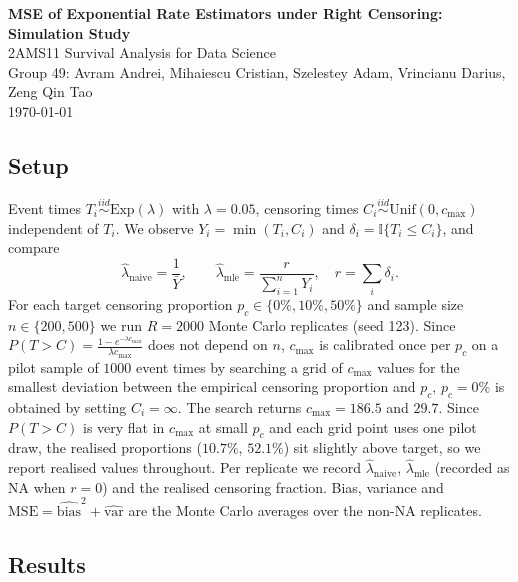\documentclass[11pt,a4paper]{article}
\begin{document}
\begin{titlepage}
\centering
\vspace*{\fill}
{\LARGE \textbf{MSE of Exponential Rate Estimators under Right Censoring:\\Simulation Study}} \\[2em]
{\large 2AMS11 Survival Analysis for Data Science \\
Group 49: Avram Andrei, Mihaiescu Cristian, Szelestey Adam, Vrincianu Darius, Zeng Qin Tao} \\[1em]
\today
\vspace*{\fill}
\end{titlepage}

\subsection*{Setup}
Event times $T_i \stackrel{iid}{\sim} \mathrm{Exp}(\lambda)$ with $\lambda = 0.05$, censoring times
$C_i \stackrel{iid}{\sim} \mathrm{Unif}(0, c_{\max})$ independent of $T_i$. We observe
$Y_i = \min(T_i, C_i)$ and $\delta_i = \mathbb{I}\{T_i \le C_i\}$, and compare
\[
\hat{\lambda}_{\text{naive}} = \frac{1}{\bar{Y}}, \qquad
\hat{\lambda}_{\text{mle}} = \frac{r}{\sum_{i=1}^n Y_i}, \quad r = \sum_i \delta_i .
\]
For each target censoring proportion $p_c \in \{0\%, 10\%, 50\%\}$ and sample size $n \in \{200, 500\}$ we
run $R = 2000$ Monte Carlo replicates (seed 123). Since
$P(T > C) = \frac{1 - e^{-\lambda c_{\max}}}{\lambda c_{\max}}$ does not depend on $n$, $c_{\max}$ is
calibrated once per $p_c$ on a pilot sample of $1000$ event times by searching a grid of $c_{\max}$ values
for the smallest deviation between the empirical censoring proportion and $p_c$, $p_c = 0\%$ is obtained by
setting $C_i = \infty$. The search returns $c_{\max} = 186.5$ and $29.7$. Since $P(T>C)$ is very flat in $c_{\max}$ at small $p_c$ and each grid point uses one pilot draw, the realised proportions ($10.7\%$, $52.1\%$) sit slightly above target, so we report realised values throughout. Per replicate we record $\hat{\lambda}_{\text{naive}}$, $\hat{\lambda}_{\text{mle}}$
(recorded as NA when $r = 0$) and the realised censoring fraction. Bias, variance and
$\mathrm{MSE} = \widehat{\mathrm{bias}}^2 + \widehat{\mathrm{var}}$ are the Monte Carlo averages over the
non-NA replicates.

\subsection*{Results}
\end{document}
